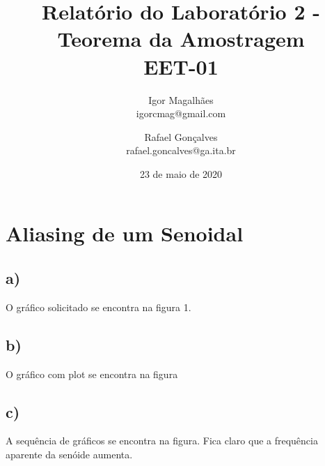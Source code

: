 \documentclass[a4paper, 12pt]{article}
\title{Relatório do Laboratório 2 - Teorema da Amostragem \\ EET-01}
\author{
  Igor Magalhães\\igorcmag@gmail.com
  \and
  Rafael Gonçalves\\rafael.goncalves@ga.ita.br
}
\date{23 de maio de 2020}
\begin{document}
\maketitle
\section{Aliasing de um Senoidal}

\subsection{a)}
O gráfico solicitado se encontra na figura 1.

%


\subsection{b)}

O gráfico com plot se encontra na figura 

%


\subsection{c)}

A sequência de gráficos se encontra na figura. Fica claro que a frequência aparente da senóide aumenta.

%

\end{document}
